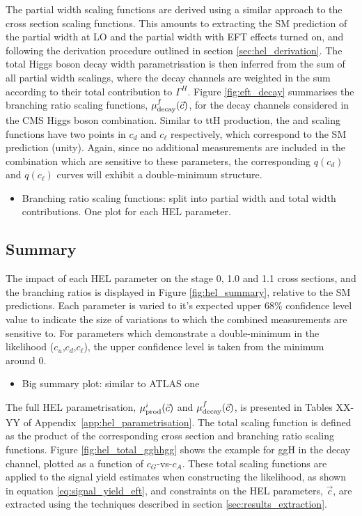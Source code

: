 The partial width scaling functions are derived using a similar approach to the cross section scaling functions. This amounts to extracting the SM prediction of the partial width at LO and the partial width with EFT effects turned on, and following the derivation procedure outlined in section \ref{sec:hel_derivation}. The total Higgs boson decay width parametrisation is then inferred from the sum of all partial width scalings, where the decay channels are weighted in the sum according to their total contribution to $\Gamma^{H}$. Figure \ref{fig:eft_decay} summarises the branching ratio scaling functions, $\mu_{\rm{decay}}^f(\vec{c})$, for the decay channels considered in the CMS Higgs boson combination. Similar to ttH production, the \Hbb and \Htautau scaling functions have two points in $c_d$ and $c_\ell$ respectively, which correspond to the SM prediction (unity). Again, since no additional measurements are included in the combination which are sensitive to these parameters, the corresponding $q(c_d)$ and $q(c_\ell)$ curves will exhibit a double-minimum structure.

\begin{itemize}
    \item Branching ratio scaling functions: split into partial width and total width contributions. One plot for each HEL parameter.
\end{itemize}

\subsection{Summary}
The impact of each HEL parameter on the stage 0, 1.0 and 1.1 cross sections, and the branching ratios is displayed in Figure \ref{fig:hel_summary}, relative to the SM predictions. Each parameter is varied to it's expected upper 68\% confidence level value to indicate the size of variations to which the combined measurements are sensitive to. For parameters which demonstrate a double-minimum in the likelihood ($c_u$,$c_d$,$c_\ell$), the upper confidence level is taken from the minimum around 0. 

\begin{itemize}
    \item Big summary plot: similar to ATLAS one
\end{itemize}

The full HEL parametrisation, $\mu_{\rm{prod}}^i(\vec{c})$ and $\mu_{\rm{decay}}^f(\vec{c})$, is presented in Tables XX-YY of Appendix~\ref{app:hel_parametrisation}. The total scaling function is defined as the product of the corresponding cross section and branching ratio scaling functions. Figure \ref{fig:hel_total_gghhgg} shows the example for ggH in the \Hgg decay channel, plotted as a function of $c_G$-vs-$c_A$. These total scaling functions are applied to the signal yield estimates when constructing the likelihood, as shown in equation \ref{eq:signal_yield_eft}, and constraints on the HEL parameters, $\vec{c}$, are extracted using the techniques described in section \ref{sec:results_extraction}.

